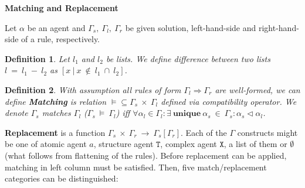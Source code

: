 \documentclass[12pt]{article}
\newtheorem{mydef}{Definition}
\newcommand{\mysection}[1]{{\newpage\centering\Large\textbf{#1}\\}\normalsize\vspace{0.5cm}}
\begin{document}
\mysection{Matching and Replacement}

Let $\alpha$ be an agent and $\Gamma_s,~\Gamma_l,~\Gamma_r$ be given solution, left-hand-side and right-hand-side of a rule, respectively.

\begin{mydef}
Let $l_1$ and $l_2$ be lists. We define difference between two lists $l~=~l_1~-~l_2$ as $[ x~|~x~\not\in~l_1~\cap~l_2 ]$.
\end{mydef}

\begin{mydef}
With assumption all rules of form $\Gamma_l\Rightarrow\Gamma_r$ are well-formed, we can define \textbf{Matching} is relation $\models \subseteq \Gamma_s~\times~\Gamma_l $ defined via \textit{compatibility} operator. We denote $\Gamma_s$ \textit{matches} $\Gamma_l$ ($ \Gamma_s~\models~\Gamma_l$) iff $\forall \alpha_l \in \Gamma_l: \exists~\pmb{unique}~\alpha_s~\in~\Gamma_s: \alpha_s \lhd \alpha_l$.
\end{mydef}


\textbf{Replacement} is a function $\Gamma_s~\times~\Gamma_r~\rightarrow~\Gamma_s[\Gamma_r]$. Each of the $\Gamma$ constructs might be one of atomic agent $a$, structure agent $\mathtt{T}$, complex agent $\mathtt{X}$, a list of them or $\emptyset$ (what follows from flattening of the rules). Before replacement can be applied, matching in left column must be satisfied. Then, five match/replacement categories can be distinguished:
\end{document}
